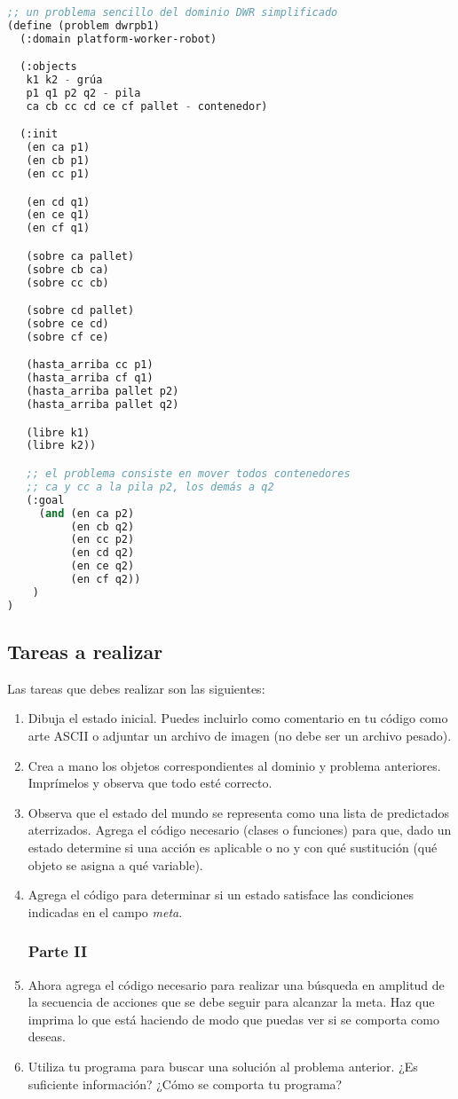 \begin{lstlisting}[language=Lisp]
;; un problema sencillo del dominio DWR simplificado
(define (problem dwrpb1)
  (:domain platform-worker-robot)

  (:objects
   k1 k2 - grúa
   p1 q1 p2 q2 - pila
   ca cb cc cd ce cf pallet - contenedor)

  (:init
   (en ca p1)
   (en cb p1)
   (en cc p1)

   (en cd q1)
   (en ce q1)
   (en cf q1)

   (sobre ca pallet)
   (sobre cb ca)
   (sobre cc cb)

   (sobre cd pallet)
   (sobre ce cd)
   (sobre cf ce)

   (hasta_arriba cc p1)
   (hasta_arriba cf q1)
   (hasta_arriba pallet p2)
   (hasta_arriba pallet q2)

   (libre k1)
   (libre k2))

   ;; el problema consiste en mover todos contenedores
   ;; ca y cc a la pila p2, los demás a q2
   (:goal
     (and (en ca p2)
          (en cb q2)
          (en cc p2)
          (en cd q2)
          (en ce q2)
          (en cf q2))
    )
)
\end{lstlisting}

\subsection{Tareas a realizar}

Las tareas que debes realizar son las siguientes:
\begin{enumerate}
\subsubsection{Parte I}
 \item Dibuja el estado inicial.  Puedes incluirlo como comentario en tu código como arte ASCII o adjuntar un archivo de imagen (no debe ser un archivo pesado).
 \item Crea a mano los objetos correspondientes al dominio y problema anteriores.
       Imprímelos y observa que todo esté correcto.
 \item Observa que el estado del mundo se representa como una lista de predictados aterrizados.
       Agrega el código necesario (clases o funciones) para que, dado un estado determine si una
       acción es aplicable o no y con qué sustitución (qué objeto se asigna a qué variable).
 \item Agrega el código para determinar si un estado satisface las condiciones indicadas en el 
       campo \emph{meta}.
\subsubsection{Parte II}
 \item Ahora agrega el código necesario para realizar una búsqueda en amplitud de la secuencia
       de acciones que se debe seguir para alcanzar la meta.  Haz que imprima lo que está
       haciendo de modo que puedas ver si se comporta como deseas.
 \item Utiliza tu programa para buscar una solución al problema anterior.
       ¿Es suficiente información? ¿Cómo se comporta tu programa?
\end{enumerate}
